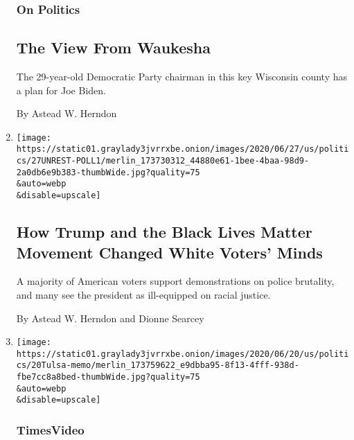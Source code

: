 \begin{enumerate}
  \hypertarget{on-politics}{%
  \subsubsection{On Politics}\label{on-politics}}

  \hypertarget{the-view-from-waukesha}{%
  \subsection{The View From Waukesha}\label{the-view-from-waukesha}}

  The 29-year-old Democratic Party chairman in this key Wisconsin county
  has a plan for Joe Biden.

  By Astead W. Herndon
\item
  \href{/2020/06/27/us/politics/trump-biden-protests-polling.html}{}

  \texttt{[image: https://static01.graylady3jvrrxbe.onion/images/2020/06/27/us/politics/27UNREST-POLL1/merlin\_173730312\_44880e61-1bee-4baa-98d9-2a0db6e9b383-thumbWide.jpg?quality=75\\\&auto=webp\\\&disable=upscale]}

  \hypertarget{how-trump-and-the-black-lives-matter-movement-changed-white-voters-minds}{%
  \subsection{How Trump and the Black Lives Matter Movement Changed
  White Voters'
  Minds}\label{how-trump-and-the-black-lives-matter-movement-changed-white-voters-minds}}

  A majority of American voters support demonstrations on police
  brutality, and many see the president as ill-equipped on racial
  justice.

  By Astead W. Herndon and Dionne Searcey
\item
  \href{/video/us/100000007188759/trump-rally-juneteenth-tulsa-oklahoma.html}{}

  \texttt{[image: https://static01.graylady3jvrrxbe.onion/images/2020/06/20/us/politics/20Tulsa-memo/merlin\_173759622\_e9dbba95-8f13-4fff-938d-fbe7cc8a8bed-thumbWide.jpg?quality=75\\\&auto=webp\\\&disable=upscale]}

  \hypertarget{timesvideo}{%
  \subsubsection{TimesVideo}\label{timesvideo}}

  \hypertarget{why-trumps-tulsa-rally-put-the-citys-black-residents-on-edge}{%
}
\end{enumerate}
